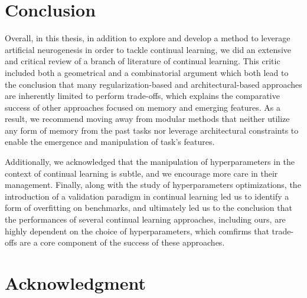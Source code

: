 \documentclass[11pt]{article}
\begin{document}



\section{Conclusion}


Overall, in this thesis, in addition to explore and develop a method to leverage artificial neurogenesis in order to tackle continual learning, we did an extensive and critical review of a branch of literature of continual learning. This critic included both a geometrical and a combinatorial argument which both lead to the conclusion that many regularization-based and architectural-based approaches are inherently limited to perform trade-offs, which explains the comparative success of other approaches focused on memory and emerging features. As a result, we recommend moving away from modular methods that neither utilize any form of memory from the past tasks nor leverage architectural constraints to enable the emergence and manipulation of task's features. 

\vspace{2mm}
\noindent
Additionally, we acknowledged that the manipulation of hyperparameters in the context of continual learning is subtle, and we encourage more care in their management. Finally, along with the study of hyperparameters optimizations, the introduction of a validation paradigm in continual learning led us to identify a form of overfitting on benchmarks, and ultimately led us to the conclusion that the performances of several continual learning approaches, including ours, are highly dependent on the choice of hyperparameters, which comfirms that trade-offs are a core component of the success of these approaches. 



\section{Acknowledgment}
\end{document}
